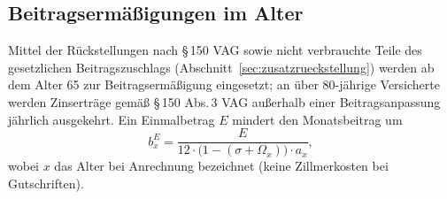 \subsection{Beitragsermäßigungen im Alter}\label{sec:beitragsermaessigung}

Mittel der Rückstellungen nach \S\,150 VAG sowie nicht verbrauchte
Teile des gesetzlichen Beitragszuschlags
(Abschnitt~\ref{sec:zusatzrueckstellung}) werden ab dem Alter 65 zur
Beitragsermäßigung eingesetzt; an über 80-jährige Versicherte werden
Zinserträge gemäß \S\,150 Abs.\,3 VAG außerhalb einer
Beitragsanpassung jährlich ausgekehrt. Ein Einmalbetrag $E$ mindert
den Monatsbeitrag um
\begin{equation}
b^{E}_x = \frac{E}{12\cdot\bigl(1-(\sigma+\Omega_x)\bigr)\cdot a_x},
\label{eq:gutschrift}
\end{equation}
wobei $x$ das Alter bei Anrechnung bezeichnet (keine Zillmerkosten bei
Gutschriften).
